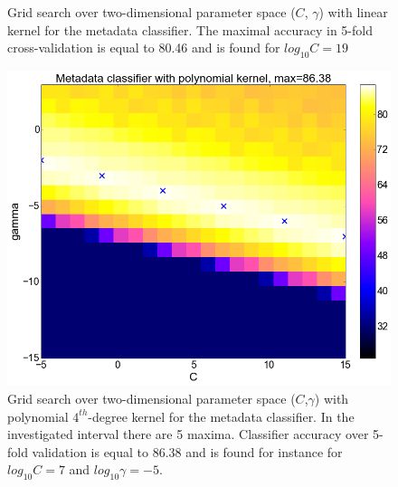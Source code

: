 \begin{center}
\begin{figure}
  \caption{Grid search over two-dimensional parameter space ($C$, $\gamma$) with linear kernel for the metadata classifier. The maximal accuracy in 5-fold cross-validation is equal to 80.46 and is found for $log_{10}C=19$}
  \label{fig:meta_linear}
\end{figure}
\begin{figure}
\centering
  \includegraphics[width=\textwidth]{plots/meta_poly}
  \caption{Grid search over two-dimensional parameter space ($C$,$\gamma$) with polynomial $4^{th}$-degree kernel for the metadata classifier. In the investigated interval there are 5 maxima. Classifier accuracy over 5-fold validation is equal to 86.38 and is found for instance for $log_{10}C=7$ and $log_{10}\gamma=-5$.}
  \label{fig:meta_poly}
\end{figure}


\end{center}
